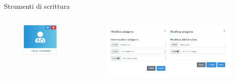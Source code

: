 \documentclass{beamer}
\begin{document}
\begin{frame}[plain]{Strumenti di scrittura}
\begin{columns}
	\begin{figure}[!h]
		\includegraphics[scale=0.3]{saniwiki_modificaeliminacategoria.png}
	\end{figure}
	\begin{figure}[!h]
		\includegraphics[scale=0.32]{saniwiki_modificacategoria.png}
	\end{figure}
\end{columns}
\end{frame}
\end{document}
